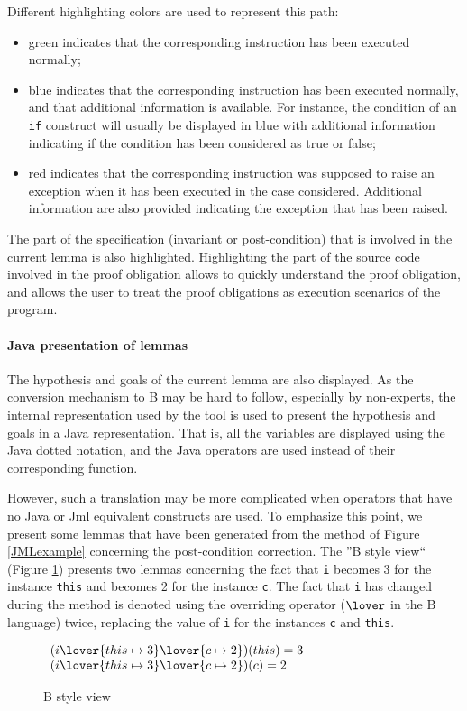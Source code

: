 Different highlighting colors are used to represent this path:
\begin{itemize}
\item green indicates that the corresponding instruction has been
   executed normally;
\item blue indicates that the corresponding instruction has been
   executed normally, and that additional information is
   available. For instance, the condition of an \texttt{if} construct will
   usually be displayed in blue with additional information indicating
   if the condition has been considered as true or false;
\item red indicates that the corresponding instruction was supposed to
   raise an exception when it has been executed in the case
   considered.  Additional information are also provided indicating
   the exception that has been raised.
\end{itemize}
The part of the specification (invariant or post-condition) that is
involved in the current lemma is also highlighted.  Highlighting the
part of the source code involved in the proof obligation allows to
quickly understand the proof obligation, and allows the user to treat
the proof obligations as execution scenarios of the program.
\paragraph{Java presentation of lemmas}
The hypothesis and goals of the current lemma are also displayed. As
the conversion mechanism to B may be hard to follow, especially by
non-experts, the internal representation used by the tool is used to
present the hypothesis and goals in a Java representation. That is,
all the variables are displayed using the Java dotted notation, and
the Java operators are used instead of their corresponding function.

However, such a translation may be more complicated when operators that
have no Java or Jml equivalent constructs are used.  To emphasize this
point, we present some lemmas that have been generated from the
method of Figure \ref{JMLexample} concerning the post-condition
correction.  The ''B style view`` (Figure \ref{B style view}) presents
two lemmas concerning the fact that \texttt{i} becomes 3 for the
instance \texttt{this} and becomes 2 for the instance \texttt{c}.
 The fact that \texttt{i} has changed during the method is denoted using
the overriding operator ($\lover$ in the B language) twice, replacing the
value of \texttt{i} for the instances \texttt{c} and \texttt{this}.
\begin{figure}[ht]
\begin{center}
$\begin{array}{l}
 (i \lover \{ this \mapsto 3\} \lover \{ c \mapsto 2 \})(this) = 3 \\
 (i \lover \{ this \mapsto 3\} \lover \{ c \mapsto 2 \})(c) = 2
\end{array}$
 \caption{B style view}
 \label{B style view}
\end{center}
\end{figure}

